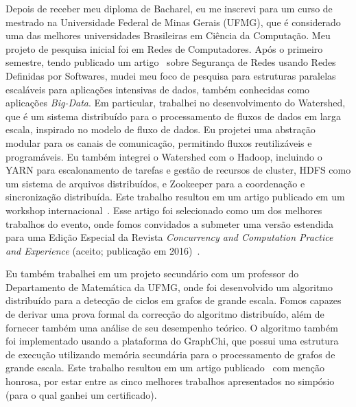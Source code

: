 \documentclass{article}
\begin{document}
Depois de receber meu diploma de Bacharel, eu me inscrevi para um curso de
mestrado na Universidade Federal de Minas Gerais (UFMG), que \'{e} considerado
uma das melhores universidades Brasileiras em Ci\^{e}ncia da
Computa\c{c}\~{a}o.  Meu projeto de pesquisa inicial foi em Redes de
Computadores. Ap\'{o}s o primeiro semestre, tendo publicado um
artigo~\cite{rocha2013smtd} sobre Seguran\c{c}a de Redes usando Redes Definidas
por Softwares, mudei meu foco de pesquisa para estruturas paralelas
escal\'{a}veis para aplica\c{c}\~{o}es intensivas de dados, tamb\'{e}m
conhecidas como aplica\c{c}\~{o}es {\em Big-Data}.
Em particular, trabalhei no desenvolvimento do Watershed, que \'{e} um sistema
distribu\'{i}do para o processamento de fluxos de dados em larga escala,
inspirado no modelo de fluxo de dados. Eu projetei uma abstra\c{c}\~{a}o
modular para os canais de comunica\c{c}\~{a}o, permitindo fluxos
reutiliz\'{a}veis e program\'{a}veis. Eu tamb\'{e}m integrei o Watershed com o
Hadoop, incluindo o YARN para escalonamento de tarefas e gest\~{a}o de recursos
de cluster, HDFS como um sistema de arquivos distribu\'{i}dos, e Zookeeper para
a coordena\c{c}\~{a}o e sincroniza\c{c}\~{a}o distribu\'{i}da.  Este trabalho
resultou em um artigo publicado em um workshop
internacional~\cite{rocha2014watershed}. Esse artigo foi selecionado como um
dos melhores trabalhos do evento, onde fomos convidados a submeter uma
vers\~{a}o estendida para uma Edi\c{c}\~{a}o Especial da Revista {\em
Concurrency and Computation Practice and Experience} (aceito; publicação em 2016)~\cite{rocha2016watershedng}.

Eu tamb\'{e}m trabalhei em um projeto secund\'{a}rio com um professor do
Departamento de Matem\'{a}tica da UFMG, onde foi desenvolvido um algoritmo
distribu\'{i}do para a detec\c{c}\~{a}o de ciclos em grafos de grande escala.
Fomos capazes de derivar uma prova formal da correc\c{c}\~{a}o do algoritmo
distribu\'{i}do, al\'{e}m de fornecer tamb\'{e}m uma an\'{a}lise de seu
desempenho te\'{o}rico. O algoritmo tamb\'{e}m foi implementado usando a
plataforma do GraphChi, que possui uma estrutura de execu\c{c}\~{a}o utilizando
mem\'{o}ria secund\'{a}ria para o processamento de grafos de grande escala.
Este trabalho resultou em um artigo publicado~\cite{rocha2015cycles} com
men\c{c}\~{a}o honrosa, por estar entre as cinco melhores trabalhos
apresentados no simp\'{o}sio (para o qual ganhei um certificado).
\end{document}
